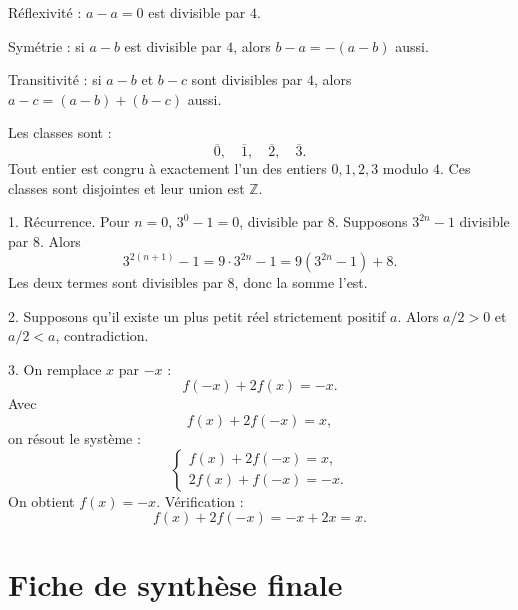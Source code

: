 \documentclass[11pt,a4paper]{article}
\newcommand{\Z}{\mathbb{Z}}
\begin{document}
\begin{correctionbox}[Exercice 4]
Réflexivité : \(a-a=0\) est divisible par \(4\).

Symétrie : si \(a-b\) est divisible par \(4\), alors \(b-a=-(a-b)\) aussi.

Transitivité : si \(a-b\) et \(b-c\) sont divisibles par \(4\), alors \(a-c=(a-b)+(b-c)\) aussi.

Les classes sont :
\[
\overline0,\quad \overline1,\quad \overline2,\quad \overline3.
\]
Tout entier est congru à exactement l'un des entiers \(0,1,2,3\) modulo \(4\). Ces classes sont disjointes et leur union est \(\Z\).
\end{correctionbox}

\begin{correctionbox}[Exercice 5]
1. Récurrence. Pour \(n=0\), \(3^0-1=0\), divisible par \(8\). Supposons \(3^{2n}-1\) divisible par \(8\). Alors
\[
3^{2(n+1)}-1=9\cdot3^{2n}-1=9(3^{2n}-1)+8.
\]
Les deux termes sont divisibles par \(8\), donc la somme l'est.

2. Supposons qu'il existe un plus petit réel strictement positif \(a\). Alors \(a/2>0\) et \(a/2<a\), contradiction.

3. On remplace \(x\) par \(-x\) :
\[
f(-x)+2f(x)=-x.
\]
Avec
\[
f(x)+2f(-x)=x,
\]
on résout le système :
\[
\begin{cases}
f(x)+2f(-x)=x,\\
2f(x)+f(-x)=-x.
\end{cases}
\]
On obtient \(f(x)=-x\). Vérification :
\[
f(x)+2f(-x)=-x+2x=x.
\]
\end{correctionbox}

\section{Fiche de synthèse finale}
\end{document}
